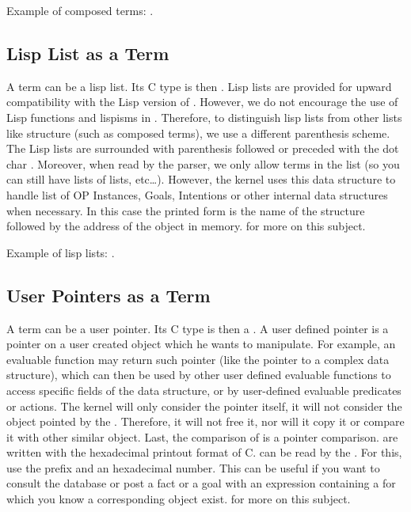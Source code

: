 Example of composed terms: .

\subsection{Lisp List as a Term}

A term can be a lisp list. Its C type is then . Lisp lists are
provided for upward compatibility with the Lisp version of \OPRS{}. However, we
do not encourage the use of Lisp functions and lispisms in \COPRS{}. Therefore,
to distinguish lisp lists from other lists like structure (such as composed
terms), we use a different parenthesis scheme. The Lisp lists are surrounded
with parenthesis followed or preceded with the dot char .  Moreover,
when read by the parser, we only allow terms in the list (so you can still have
lists of lists, etc\dots{}). However, the kernel uses this data structure to
handle list of OP Instances, Goals, Intentions or other internal data structures
when necessary.  In this case the printed form is the name of the structure
followed by the address of the object in memory.  
for more on this subject.

Example of lisp lists: .

\subsection{User Pointers as a Term}

A term can be a user pointer. Its C type is then a . A user
defined pointer is a pointer on a user created object which he wants to
manipulate. For example, an evaluable function may return such pointer (like
the pointer to a complex data structure), which can then be used by other user
defined evaluable functions to access specific fields of the data structure, or
by user-defined evaluable predicates or actions. The kernel will only consider
the pointer itself, it will not consider the object pointed by the
.  Therefore, it will not free it, nor will it copy it or
compare it with other similar object. Last, the comparison of 
is a pointer comparison.   are written with the hexadecimal
printout format of C.  can be read by the \CXPK{}. For this,
use the  prefix and an hexadecimal number.  This can be useful if you
want to consult the database or post a fact or a goal with an expression
containing a  for which you know a corresponding object
exist.  for more on this subject.

